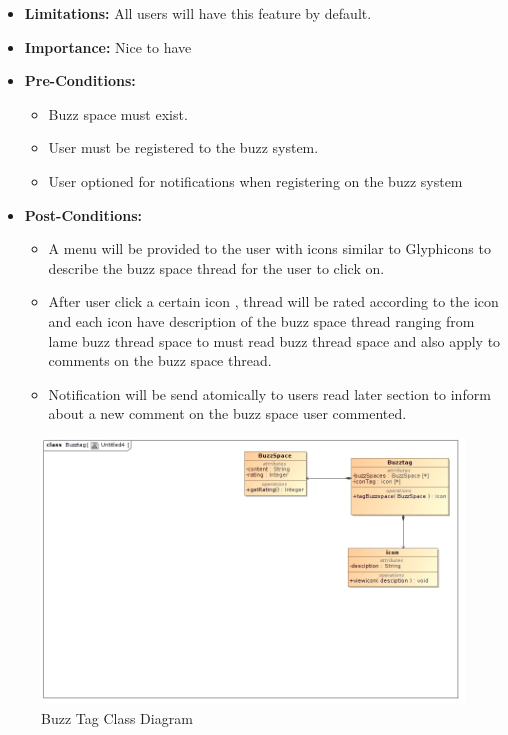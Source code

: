 \documentclass[11pt]{article}
\begin{document}
\begin{enumerate}
\begin{itemize}
\item\textbf{Limitations:} 
All users will have this feature by default.

\item \textbf{Importance:} Nice to have
\item\textbf{Pre-Conditions: }
	\begin{itemize}
	\item Buzz space must exist.
	\item User must be registered to the buzz system.
	\item User optioned for notifications when registering on the buzz system

	\end{itemize}

\item\textbf{Post-Conditions: }
	\begin{itemize}
	\item A menu will be provided to the user with icons similar to Glyphicons
to describe the buzz space thread for the user to click on.
	\item After user click a certain icon , thread will be rated according to
the icon and each icon have description of the buzz space thread
ranging from lame buzz thread space to must read buzz thread
space and also apply to comments on the buzz space thread.
\item Notification will be send atomically to users read later section to
inform about a new comment on the buzz space user commented.
	
	\end{itemize}
\end{itemize}

\begin{figure}[H]	
\graphicspath{ {../Diagrams/sfiso/} }
    	\includegraphics[scale=0.5,center]{buzzC.jpg}
    	\caption{Buzz Tag Class Diagram}
	\end{figure}
	

\end{enumerate}
\end{document}

